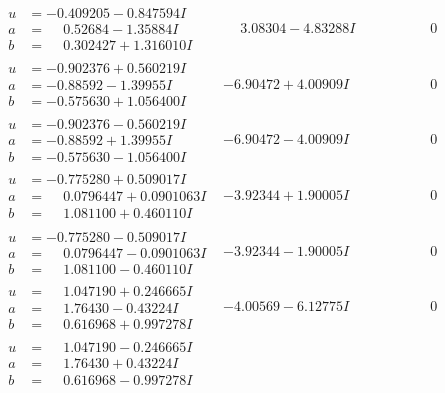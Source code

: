 \documentclass[1p]{elsarticle_modified}
\theoremstyle{definition}
\begin{document}
$$\begin{array}{c|c|c}
\begin{aligned}
u &= -0.409205 - 0.847594 I \\
a &= \phantom{-}0.52684 - 1.35884 I \\
b &= \phantom{-}0.302427 + 1.316010 I\end{aligned}
 & \phantom{-}3.08304 - 4.83288 I & \phantom{-0.000000 } 0 \\ \hline\begin{aligned}
u &= -0.902376 + 0.560219 I \\
a &= -0.88592 - 1.39955 I \\
b &= -0.575630 + 1.056400 I\end{aligned}
 & -6.90472 + 4.00909 I & \phantom{-0.000000 } 0 \\ \hline\begin{aligned}
u &= -0.902376 - 0.560219 I \\
a &= -0.88592 + 1.39955 I \\
b &= -0.575630 - 1.056400 I\end{aligned}
 & -6.90472 - 4.00909 I & \phantom{-0.000000 } 0 \\ \hline\begin{aligned}
u &= -0.775280 + 0.509017 I \\
a &= \phantom{-}0.0796447 + 0.0901063 I \\
b &= \phantom{-}1.081100 + 0.460110 I\end{aligned}
 & -3.92344 + 1.90005 I & \phantom{-0.000000 } 0 \\ \hline\begin{aligned}
u &= -0.775280 - 0.509017 I \\
a &= \phantom{-}0.0796447 - 0.0901063 I \\
b &= \phantom{-}1.081100 - 0.460110 I\end{aligned}
 & -3.92344 - 1.90005 I & \phantom{-0.000000 } 0 \\ \hline\begin{aligned}
u &= \phantom{-}1.047190 + 0.246665 I \\
a &= \phantom{-}1.76430 - 0.43224 I \\
b &= \phantom{-}0.616968 + 0.997278 I\end{aligned}
 & -4.00569 - 6.12775 I & \phantom{-0.000000 } 0 \\ \hline\begin{aligned}
u &= \phantom{-}1.047190 - 0.246665 I \\
a &= \phantom{-}1.76430 + 0.43224 I \\
b &= \phantom{-}0.616968 - 0.997278 I\end{aligned}

\end{array}$$
\end{document}
